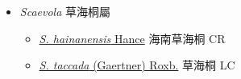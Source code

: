 
  \begin{itemize}
 \item[] \textit{Scaevola} 草海桐屬
                    
  \begin{itemize}
        \item[] \href{http://www.theplantlist.org/tpl1.1/search?q=Scaevola+hainanensis}{\textit{S. hainanensis} Hance}   海南草海桐 CR
        \item[] \href{http://www.theplantlist.org/tpl1.1/search?q=Scaevola+taccada}{\textit{S. taccada} (Gaertner) Roxb.}   草海桐 LC
  \end{itemize}
  \end{itemize}
